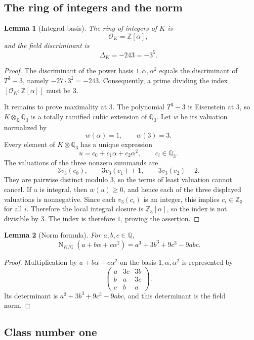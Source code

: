 \documentclass[11pt,a4paper]{article}
\newtheorem{lemma}[lemma]{Lemma}
\newcommand{\Z}{\mathbb Z}
\newcommand{\Q}{\mathbb Q}
\newcommand{\OK}{\mathcal O_K}
\newcommand{\Norm}{\operatorname{N}}
\begin{document}
\subsection{The ring of integers and the norm}

\begin{lemma}[Integral basis]\label{lem:ringintegers}
The ring of integers of $K$ is
\[
\OK=\Z[\alpha],
\]
and the field discriminant is
\[
\Delta_K=-243=-3^5.
\]
\end{lemma}

\begin{proof}
The discriminant of the power basis $1,\alpha,\alpha^2$ equals the
discriminant of $T^3-3$, namely $-27\cdot3^2=-243$.  Consequently, a
prime dividing the index $[\OK:\Z[\alpha]]$ must be $3$.

It remains to prove maximality at $3$.  The polynomial $T^3-3$ is
Eisenstein at $3$, so $K\otimes_\Q\Q_3$ is a totally ramified cubic
extension of $\Q_3$.  Let $w$ be its valuation normalized by
\[
w(\alpha)=1,
\qquad
w(3)=3.
\]
Every element of $K\otimes\Q_3$ has a unique expression
\[
u=c_0+c_1\alpha+c_2\alpha^2,
\qquad c_i\in\Q_3.
\]
The valuations of the three nonzero summands are
\[
3v_3(c_0),\qquad 3v_3(c_1)+1,\qquad 3v_3(c_2)+2.
\]
They are pairwise distinct modulo $3$, so the terms of least valuation
cannot cancel.  If $u$ is integral, then $w(u)\ge0$, and hence each of the
three displayed valuations is nonnegative.  Since each $v_3(c_i)$ is an
integer, this implies $c_i\in\Z_3$ for all $i$.  Therefore the local
integral closure is $\Z_3[\alpha]$, so the index is not divisible by $3$.
The index is therefore $1$, proving the assertion.
\end{proof}

\begin{lemma}[Norm formula]\label{lem:norm}
For $a,b,c\in\Q$,
\[
\Norm_{K/\Q}(a+b\alpha+c\alpha^2)
 =a^3+3b^3+9c^3-9abc.
\]
\end{lemma}

\begin{proof}
Multiplication by $a+b\alpha+c\alpha^2$ on the basis
$1,\alpha,\alpha^2$ is represented by
\[
\begin{pmatrix}
 a&3c&3b\\
 b&a&3c\\
 c&b&a
\end{pmatrix}.
\]
Its determinant is $a^3+3b^3+9c^3-9abc$, and this determinant is the
field norm.
\end{proof}

\subsection{Class number one}
\end{document}
